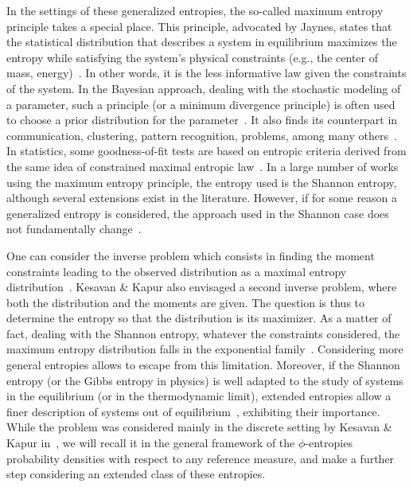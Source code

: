 \documentclass[entropy,article,submit,moreauthors,pdftex]{Definitions/mdpi}
\newcommand{\SZ}[1]{{\color{blue} #1}}                                       %
\begin{document}
In the  settings of these  generalized entropies, the so-called  maximum entropy
principle takes  a special place.   This principle, advocated by  Jaynes, states
that  the  statistical  distribution  that describes  a  system  in  equilibrium
maximizes the entropy while satisfying  the system's physical constraints (e.g.,
the  center of  mass, energy)~\cite{Jay57,  Kap89, Arn01,  CovTho06, Gok75}.  In
other  words, it  is  the less  informative  law given  the  constraints of  the
system. In the Bayesian approach, dealing  with the stochastic modeling of a
parameter, such a principle (or a minimum divergence principle) is often used to
choose  a  prior  distribution  for  the  parameter~\cite{Jay68,  Csi91,  Bas13,
  FriSri08, Rob07}. It also finds  its counterpart in communication, clustering,
pattern recognition,  problems, among many others~\cite{Kap89,  Jay82, JonByr90,
  Arn01,  HerMa02, ParBer09}.   In  statistics, some  goodness-of-fit tests  are
based on  entropic criteria derived  from the  same idea of  constrained maximal
entropic  law~\cite{Vas76, Gok83,  Son02, Leq14,  Leq15, GirReg15}.  In a  large
number of  works using the  maximum entropy principle,  the entropy used  is the
Shannon entropy, although several extensions  exist in the literature.  However,
if for some reason a generalized entropy is considered, the approach used in the
Shannon   case  does   not  fundamentally   change~\cite{KesKap89,  BorLew91:03,
  BorLew91:05, BorLew93}.

One  can consider  the  inverse problem  which consists  in  finding the  moment
constraints  leading  to   the  observed  distribution  as   a  maximal  entropy
distribution~\cite{KesKap89}.  Kesavan \& Kapur  also envisaged a second inverse
problem, where both the distribution and the moments are given.  The question is
thus to determine  the entropy so that  the distribution is its  maximizer. As a
matter  of fact,  dealing with  the  Shannon entropy,  whatever the  constraints
considered,  the   maximum  entropy   distribution  falls  in   the  exponential
family~\cite{CovTho06, BorLew91:05, Arn01,  MezMon09}.  Considering more general
entropies  allows to  escape from  this  limitation.  Moreover,  if the  Shannon
entropy  (or the  Gibbs entropy  in physics)  is well  adapted to  the study  of
systems in the  equilibrium (or in the thermodynamic  limit), extended entropies
allow a finer  description of systems out  of equilibrium~\cite{Tsa88, TsaMen98,
  Tsa99,  Tsa09, EssSch00,  ParBir05}, exhibiting  their importance.   While the
problem  was considered  mainly  in the  discrete setting  by  Kesavan \&  Kapur
in~\cite{KesKap89},  \SZ{we will  recall  it  in the  general  framework of  the
  $\phi$-entropies probability densities with respect to any reference measure,}
and make a further step considering an extended class of these entropies.
\end{document}
